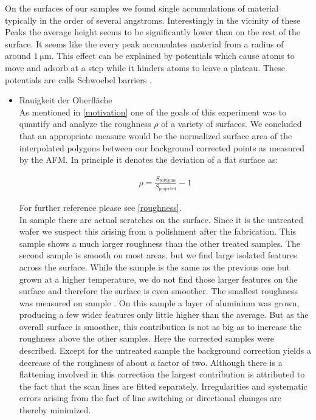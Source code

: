 \documentclass[paper=a4,fontsize=10pt,DIV=18,twocolumn,parskip=half]{scrartcl}
\numberwithin{equation}{section}    %
\begin{document}
On the surfaces of our samples we found single accumulations of material 
typically in the order of several angstroms. Interestingly in the vicinity of 
these Peaks the average height seems to be significantly lower than on the rest 
of the surface. It seems like the every peak accumulates material from a radius 
of around $\SI{1}{\micro\meter}$. This effect can be explained by potentials 
which cause atoms to move and adsorb at a step while it hinders atoms to leave a 
plateau. These potentials are calls Schwoebel barriers \cite{merikoski}.
\begin{itemize}
\item Rauigkeit der Oberfläche\\

As mentioned in \cref{motivation} one of the goals of this experiment was to 
quantify and analyze the roughness $\rho$ of a variety of surfaces. We concluded 
that an appropriate measure would be the normalized surface area of the 
interpolated polygons between our background corrected points as measured by the 
AFM. In principle it denotes the deviation of a flat surface as:

\begin{align}
    \rho = \frac{S_{\text{polygons}}}{S_{\text{projected}}} - 1
\end{align}

For further reference please see \cref{roughness}.  \\
In sample  there are actual scratches on the surface. Since it is the 
untreated wafer we suspect this arising from a polishment after the fabrication. 
This sample shows a much larger roughness than the other treated samples. The 
second sample  is smooth on most areas, but we find large isolated 
features across the surface. While the sample  is the same as the 
previous one but grown at a higher temperature, we do not find those larger 
features on the surface and therefore the surface is even smoother. The smallest 
roughness was measured on sample . On this sample a layer of 
aluminium was grown, producing a few wider features only little higher than the 
average. But as the overall surface is smoother, this contribution is not as big 
as to increase the roughness above the other samples. Here the corrected samples 
were described. Except for the untreated sample  the background 
correction yields a decrease of the roughness of about a factor of two. Although 
there is a flattening involved in this correction the largest contribution is 
attributed to the fact that the scan lines are fitted separately. Irregularities 
and systematic errors arising from the fact of line switching or directional 
changes are thereby minimized. 

\end{itemize}
\end{document}
